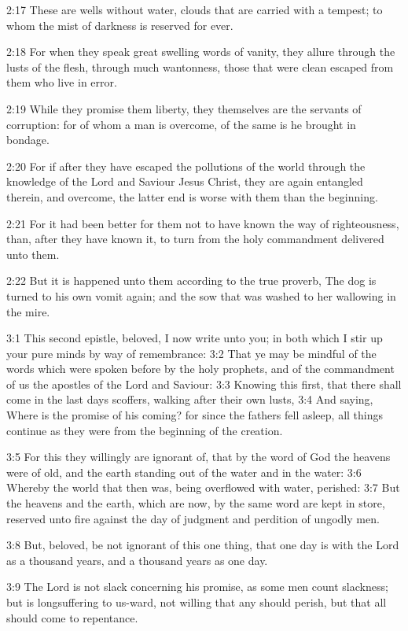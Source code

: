 2:17 These are wells without water, clouds that are carried with a
tempest; to whom the mist of darkness is reserved for ever.

2:18 For when they speak great swelling words of vanity, they allure
through the lusts of the flesh, through much wantonness, those that
were clean escaped from them who live in error.

2:19 While they promise them liberty, they themselves are the servants
of corruption: for of whom a man is overcome, of the same is he
brought in bondage.

2:20 For if after they have escaped the pollutions of the world
through the knowledge of the Lord and Saviour Jesus Christ, they are
again entangled therein, and overcome, the latter end is worse with
them than the beginning.

2:21 For it had been better for them not to have known the way of
righteousness, than, after they have known it, to turn from the holy
commandment delivered unto them.

2:22 But it is happened unto them according to the true proverb, The
dog is turned to his own vomit again; and the sow that was washed to
her wallowing in the mire.

3:1 This second epistle, beloved, I now write unto you; in both which
I stir up your pure minds by way of remembrance: 3:2 That ye may be
mindful of the words which were spoken before by the holy prophets,
and of the commandment of us the apostles of the Lord and Saviour: 3:3
Knowing this first, that there shall come in the last days scoffers,
walking after their own lusts, 3:4 And saying, Where is the promise of
his coming? for since the fathers fell asleep, all things continue as
they were from the beginning of the creation.

3:5 For this they willingly are ignorant of, that by the word of God
the heavens were of old, and the earth standing out of the water and
in the water: 3:6 Whereby the world that then was, being overflowed
with water, perished: 3:7 But the heavens and the earth, which are
now, by the same word are kept in store, reserved unto fire against
the day of judgment and perdition of ungodly men.

3:8 But, beloved, be not ignorant of this one thing, that one day is
with the Lord as a thousand years, and a thousand years as one day.

3:9 The Lord is not slack concerning his promise, as some men count
slackness; but is longsuffering to us-ward, not willing that any
should perish, but that all should come to repentance.


